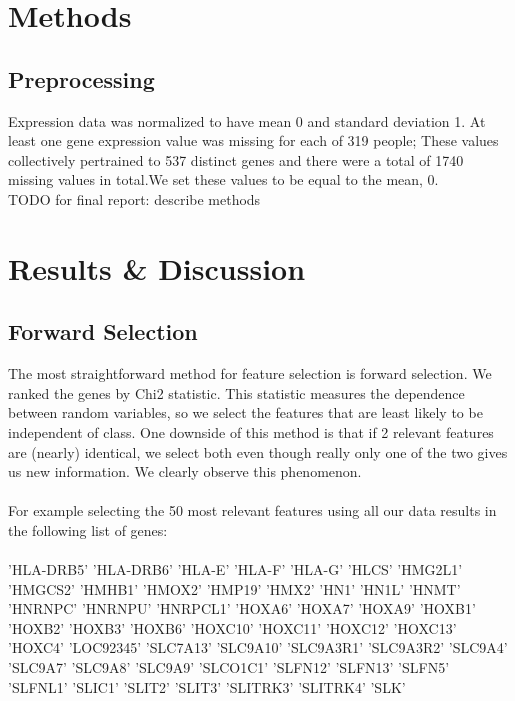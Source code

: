 \documentclass[11pt]{article}
\begin{document}
\section{Methods}

\subsection{Preprocessing} 
Expression data was normalized to have mean 0 and standard deviation 1. At least one gene expression value was missing for each of 319 people; These values collectively pertrained to 537 distinct genes and there were a total of 1740 missing values in total.We set these values to be equal to the mean, 0. \\

TODO for final report: describe methods



\section{Results \& Discussion}

\subsection{Forward Selection}
The most straightforward method for feature selection is forward selection. We ranked the genes by Chi2 statistic. This statistic measures the dependence between random variables, so we select the features that are least likely to be independent of class. One downside of this method is that if 2 relevant features are (nearly) identical, we select both even though really only one of the two gives us new information. We clearly observe this phenomenon. \\\\
For example selecting the 50 most relevant features using all our data results in the following list of genes:\\\\
'HLA-DRB5' 'HLA-DRB6' 'HLA-E' 'HLA-F' 'HLA-G' 'HLCS' 'HMG2L1' 'HMGCS2'
 'HMHB1' 'HMOX2' 'HMP19' 'HMX2' 'HN1' 'HN1L' 'HNMT' 'HNRNPC' 'HNRNPU'
 'HNRPCL1' 'HOXA6' 'HOXA7' 'HOXA9' 'HOXB1' 'HOXB2' 'HOXB3' 'HOXB6' 'HOXC10'
 'HOXC11' 'HOXC12' 'HOXC13' 'HOXC4' 'LOC92345' 'SLC7A13' 'SLC9A10'
 'SLC9A3R1' 'SLC9A3R2' 'SLC9A4' 'SLC9A7' 'SLC9A8' 'SLC9A9' 'SLCO1C1'
 'SLFN12' 'SLFN13' 'SLFN5' 'SLFNL1' 'SLIC1' 'SLIT2' 'SLIT3' 'SLITRK3'
 'SLITRK4' 'SLK'
 
\end{document}

